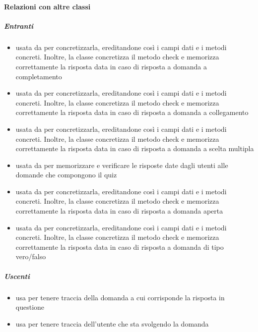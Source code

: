\paragraph{Relazioni con altre classi}
\subparagraph{Entranti}
\begin{itemize}
\item usata da  per concretizzarla, ereditandone così i campi dati e i metodi concreti. Inoltre, la classe concretizza il metodo check e memorizza correttamente la risposta data in caso di risposta a domanda a completamento
\item usata da  per concretizzarla, ereditandone così i campi dati e i metodi concreti. Inoltre, la classe concretizza il metodo check e memorizza correttamente la risposta data in caso di risposta a domanda a collegamento
\item usata da  per concretizzarla, ereditandone così i campi dati e i metodi concreti. Inoltre, la classe concretizza il metodo check e memorizza correttamente la risposta data in caso di risposta a domanda a scelta multipla
\item usata da  per memorizzare e verificare le risposte date dagli utenti alle domande che compongono il quiz
\item usata da  per concretizzarla, ereditandone così i campi dati e i metodi concreti. Inoltre, la classe concretizza il metodo check e memorizza correttamente la risposta data in caso di risposta a domanda aperta
\item usata da  per concretizzarla, ereditandone così i campi dati e i metodi concreti. Inoltre, la classe concretizza il metodo check e memorizza correttamente la risposta data in caso di risposta a domanda di tipo vero/falso
\end{itemize}
\subparagraph{Uscenti}
\begin{itemize}
\item usa  per tenere traccia della domanda a cui corrisponde la risposta in questione
\item usa  per tenere traccia dell'utente che sta svolgendo la domanda
\end{itemize}
